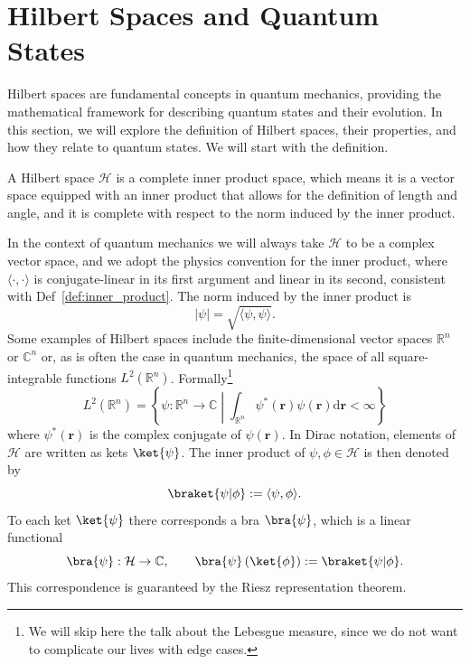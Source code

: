 \section{Hilbert Spaces and Quantum States}\label{sec:hilbert_spaces_and_quantum_states}
Hilbert spaces are fundamental concepts in quantum mechanics, providing the mathematical framework for describing quantum states and their evolution. In this section, we will explore the definition of Hilbert spaces, their properties, and how they relate to quantum states. We will start with the definition.
\begin{definition}
A Hilbert space $\mathcal{H}$ is a complete inner product space, which means it is a vector space equipped with an inner product that allows for the definition of length and angle, and it is complete with respect to the norm induced by the inner product.
\end{definition}
In the context of quantum mechanics we will always take $\mathcal{H}$ to be a complex vector space, and we adopt the physics convention for the inner product, where $\langle\cdot,\cdot\rangle$ is conjugate-linear in its first argument and linear in its second, consistent with Def~\ref{def:inner_product}. The norm induced by the inner product is
\begin{equation}
\lvert\psi\rvert = \sqrt{\langle\psi,\psi\rangle}.
\end{equation}
Some examples of Hilbert spaces include the finite-dimensional vector spaces $\mathbb{R}^n$ or $\mathbb{C}^n$ or, as is often the case in quantum mechanics, the space of all square-integrable functions $L^2(\mathbb{R}^n)$. Formally\footnote{We will skip here the talk about the Lebesgue measure, since we do not want to complicate our lives with edge cases.}
\begin{equation}
L^2(\mathbb{R}^n)=\left\lbrace\psi :\mathbb{R}^n\to\mathbb{C}\middle\vert\int_{\mathbb{R}^n}\psi^*(\symbf{r})\psi(\symbf{r})\mathrm{d}\symbf{r}<\infty\right\rbrace
\end{equation}
where $\psi^*(\symbf{r})$ is the complex conjugate of $\psi(\symbf{r})$. In Dirac notation, elements of $\mathcal{H}$ are written as kets $\ket{\psi}$. The inner product of $\psi,\phi\in\mathcal{H}$ is then denoted by
\begin{equation}
\braket{\psi\vert\phi}:=\langle\psi,\phi\rangle.
\end{equation}
To each ket $\ket{\psi}$ there corresponds a bra $\bra{\psi}$, which is a linear functional
\begin{equation}
\bra{\psi} : \mathcal{H}\to\mathbb{C},\qquad\bra{\psi}\left(\ket{\phi}\right):=\braket{\psi|\phi}.
\end{equation}
This correspondence is guaranteed by the Riesz representation theorem.

